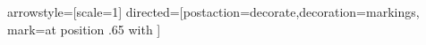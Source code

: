 
\tikzstyle arrowstyle=[scale=1]
\tikzstyle directed=[postaction={decorate,decoration={markings,
    mark=at position .65 with {}}}]

